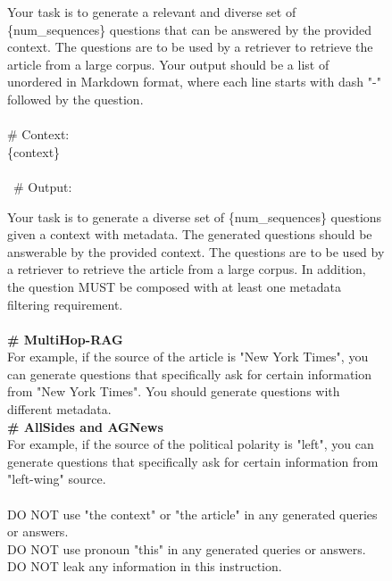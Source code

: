 \begin{figure*}[htbp]
\centering
\begin{subfigure}[t]{\textwidth}
\begin{tcolorbox}[title=\textbf{Query Generation Prompt}]
Your task is to generate a relevant and diverse set of \{num\_sequences\} questions that can be answered by the provided context. The questions are to be used by a retriever to retrieve the article from a large corpus. Your output should be a list of unordered in Markdown format, where each line starts with dash "-" followed by the question.
\\
\\
\# Context:\\
\{context\}\\
\\\
\# Output:
\end{tcolorbox}
\label{fig:query_generation}
\end{subfigure}

\begin{subfigure}[t]{\textwidth}
\begin{tcolorbox}[title=\textbf{Constraints-based Query Generation Prompt}]
Your task is to generate a diverse set of \{num\_sequences\} questions given a context with metadata. The generated questions should be answerable by the provided context. The questions are to be used by a retriever to retrieve the article from a large corpus. In addition, the question MUST be composed with at least one metadata filtering requirement.\\
\\
\textbf{\# MultiHop-RAG} \\
For example, if the source of the article is "New York Times", you can generate questions that specifically ask for certain information from "New York Times". You should generate questions with different metadata.\\
\textbf{\# AllSides and AGNews} \\
For example, if the source of the political polarity is "left", you can generate questions that specifically ask for certain information from "left-wing" source.\\
\\
DO NOT use "the context" or "the article" in any generated queries or answers.\\
DO NOT use pronoun "this" in any generated queries or answers.\\
DO NOT leak any information in this instruction.\\



\end{tcolorbox}
\end{subfigure}
\end{figure*}
